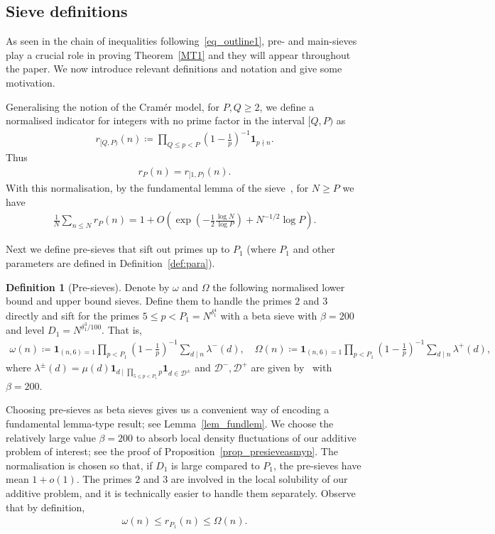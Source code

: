 \documentclass[12pt]{amsart}
\theoremstyle{definition}
\newtheorem{definition}[theorem]{Definition}
\theoremstyle{remark}
\numberwithin{equation}{section}
\newcommand{\1}{\mathbf{1}}
\begin{document}
\subsection{Sieve definitions}

As seen in the chain of inequalities following~\eqref{eq_outline1}, pre- and main-sieves play a crucial role in proving Theorem~\ref{MT1} and they will appear throughout the paper. We now introduce relevant definitions and notation and give some motivation.

Generalising the notion of the Cram\'er model, for $P,Q\geq 2$, we define a normalised indicator for integers with no prime factor in the interval $[Q,P)$ as
\begin{align*}
r_{[Q,P)}(n)\coloneqq \prod_{Q\leq p < P}\left(1-\frac{1}{p}\right)^{-1}\1_{p\nmid n}.    
\end{align*}
Thus
\begin{align*}
    r_{P}(n)=r_{[1,P)}(n).
\end{align*}
With this normalisation, by the fundamental lemma of the sieve~\cite[Lemma 6.8]{cribro}, for $N\geq P$ we have
\begin{align*}
\frac{1}{N}\sum_{n\leq N}r_P(n)=1+O\left(\exp\left(-\frac{1}{2}\frac{\log N}{\log P}\right)+N^{-1/2}\log P\right).
\end{align*}


Next we define pre-sieves that sift out primes up to $P_1$ (where $P_1$ and other parameters are defined in Definition~\ref{def:para}).

\begin{definition}[Pre-sieves] \label{def:presieve}
    Denote by $\omega$ and $\Omega$ the following normalised lower bound and upper bound sieves. Define them to handle the primes $2$ and $3$ directly and sift for the primes $5\leq p < P_1=N^{\delta_1^4}$ with a beta sieve with $\beta=200$ and level $D_1=N^{\delta_1^3/100}$. That is, 
    \begin{align*}
        \omega(n)\coloneqq \1_{(n,6)=1}\prod_{p < P_1}\left(1-\frac{1}{p}\right)^{-1}\sum_{d\mid n}\lambda^{-}(d),\quad \Omega(n)\coloneqq \1_{(n,6)=1}\prod_{p < P_1}\left(1-\frac{1}{p}\right)^{-1}\sum_{d\mid n}\lambda^{+}(d),
    \end{align*}
    where $\lambda^{\pm}(d)=\mu(d)\1_{d\mid \prod_{5\leq p < P_1}p}\1_{d\in \mathcal{D}^{\pm}}$ and $\mathcal{D}^-, \mathcal{D}^{+}$ are given by~\cite[equation (6.55)]{cribro} with $\beta=200$.
\end{definition}
Choosing pre-sieves as beta sieves gives us a convenient way of encoding a fundamental lemma-type result; see Lemma~\ref{lem_fundlem}. We choose the relatively large value $\beta=200$ to absorb local density fluctuations of our additive problem of interest; see the proof of Proposition~\ref{prop_presieveasmyp}. The normalisation is chosen so that, if $D_1$ is large compared to $P_1$, the pre-sieves have mean $1+o(1)$. The primes $2$ and $3$ are involved in the local solubility of our additive problem, and it is technically easier to handle them separately. Observe that by definition,
\begin{align*}
    \omega(n) \leq r_{P_1}(n) \leq \Omega(n).
\end{align*}
\end{document}
